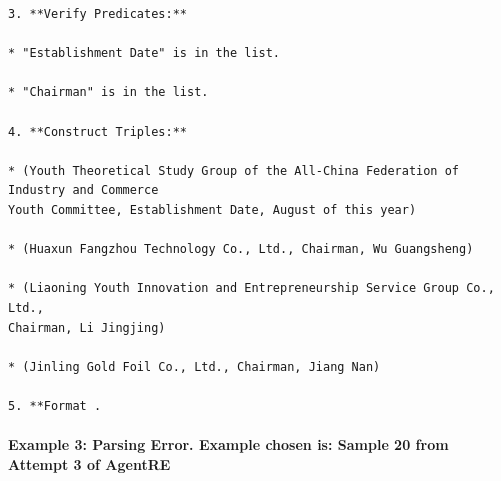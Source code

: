 \begin{verbatim}
3. **Verify Predicates:**

* "Establishment Date" is in the list.

* "Chairman" is in the list.

4. **Construct Triples:**

* (Youth Theoretical Study Group of the All-China Federation of Industry and Commerce 
Youth Committee, Establishment Date, August of this year)

* (Huaxun Fangzhou Technology Co., Ltd., Chairman, Wu Guangsheng)

* (Liaoning Youth Innovation and Entrepreneurship Service Group Co., Ltd., 
Chairman, Li Jingjing)

* (Jinling Gold Foil Co., Ltd., Chairman, Jiang Nan)

5. **Format .
\end{verbatim}

\paragraph{Example 3: Parsing Error. Example chosen is: Sample 20 from Attempt 3 of AgentRE}

